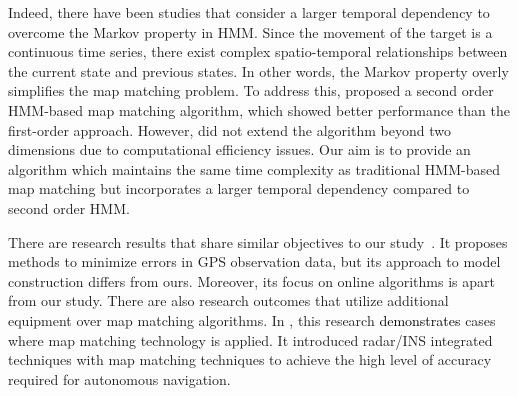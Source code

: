 \documentclass[preprint,12pt]{elsarticle}
\begin{document}
Indeed, there have been studies that consider a larger temporal dependency to overcome the Markov property in HMM. Since the movement of the target is a continuous time series, there exist complex spatio-temporal relationships between the current state and previous states. In other words, the Markov property overly simplifies the map matching problem. To address this, \cite{fu2021online} proposed a second order HMM-based map matching algorithm, which showed better performance than the first-order approach. However, \cite{fu2021online} did not extend the algorithm beyond two dimensions due to computational efficiency issues. Our aim is to provide an algorithm which maintains the same time complexity as traditional HMM-based map matching but incorporates a larger temporal dependency compared to second order HMM.

There are research results that share similar objectives to our study~\cite{hu2023amm}. It proposes methods to minimize errors in GPS observation data, but its approach to model construction differs from ours. Moreover, its focus on online algorithms is apart from our study.
	There are also research outcomes that utilize additional equipment over map matching algorithms.
	 In \cite{elkholy2023radar}, this research \textcolor{black}{demonstrates} cases where map matching technology is applied. It introduced radar/INS integrated techniques with map matching techniques to achieve the high level of accuracy required for autonomous navigation.
	
\end{document}
